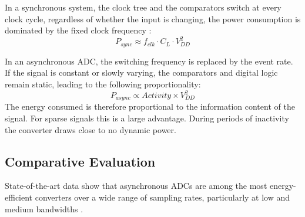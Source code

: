 In a synchronous system, the clock tree and the comparators switch at every clock cycle, regardless of whether the input is changing, the power consumption is dominated by the fixed clock frequency \cite{baker_cmos_2010}:
\begin{equation}
  P_{sync} \approx f_{clk} \cdot C_{L} \cdot V_{DD}^2
\end{equation}

In an asynchronous ADC, the switching frequency is replaced by the event rate. If the signal is constant or slowly varying, the comparators and digital logic remain static, leading to the following proportionality:
\begin{equation}
  P_{async} \propto Activity \times V_{DD}^2
\end{equation}
The energy consumed is therefore proportional to the information content of the signal. For sparse signals this is a large advantage. During periods of inactivity the converter draws close to no dynamic power.

\subsection{Comparative Evaluation}
State-of-the-art data show that asynchronous ADCs are among the most energy-efficient converters over a wide range of sampling rates, particularly at low and medium bandwidths \cite{lim_2013}.

